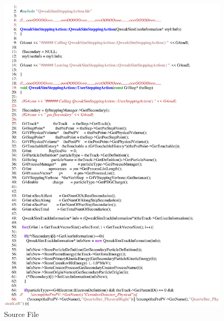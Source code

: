 \begin{figure}[h]
  \hspace{0cm}
  \includegraphics[scale=0.8]{./figures16/QweakSimSteppingAction.cc-p1.eps}
  \caption{Source File}
           \label{fig:XVI-SC-2}
\end{figure}
\clearpage

